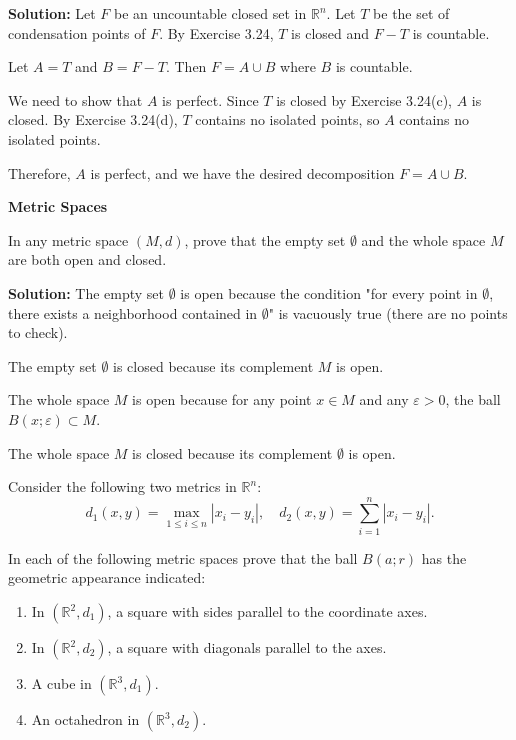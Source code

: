 \textbf{Solution:} Let $F$ be an uncountable closed set in $\mathbb{R}^n$. Let $T$ be the set of condensation points of $F$. By Exercise 3.24, $T$ is closed and $F - T$ is countable.

Let $A = T$ and $B = F - T$. Then $F = A \cup B$ where $B$ is countable.

We need to show that $A$ is perfect. Since $T$ is closed by Exercise 3.24(c), $A$ is closed. By Exercise 3.24(d), $T$ contains no isolated points, so $A$ contains no isolated points.

Therefore, $A$ is perfect, and we have the desired decomposition $F = A \cup B$.

\textbf{Metric Spaces}

\begin{problembox}
In any metric space \((M, d)\), prove that the empty set \( \emptyset \) and the whole space \( M \) are both open and closed.
\end{problembox}

\textbf{Solution:} The empty set $\emptyset$ is open because the condition "for every point in $\emptyset$, there exists a neighborhood contained in $\emptyset$" is vacuously true (there are no points to check).

The empty set $\emptyset$ is closed because its complement $M$ is open.

The whole space $M$ is open because for any point $x \in M$ and any $\varepsilon > 0$, the ball $B(x;\varepsilon) \subset M$.

The whole space $M$ is closed because its complement $\emptyset$ is open.

\begin{problembox}
Consider the following two metrics in \( \mathbb{R}^n \):
\[d_1(x, y) = \max_{1 \leq i \leq n} |x_i - y_i|, \quad d_2(x, y) = \sum_{i=1}^n |x_i - y_i|.\]

In each of the following metric spaces prove that the ball \( B(a; r) \) has the geometric appearance indicated:
\begin{enumerate}[label=\alph*)]
\item In \( (\mathbb{R}^2, d_1) \), a square with sides parallel to the coordinate axes.
\item In \( (\mathbb{R}^2, d_2) \), a square with diagonals parallel to the axes.
\item A cube in \( (\mathbb{R}^3, d_1) \).
\item An octahedron in \( (\mathbb{R}^3, d_2) \).
\end{enumerate}
\end{problembox}

